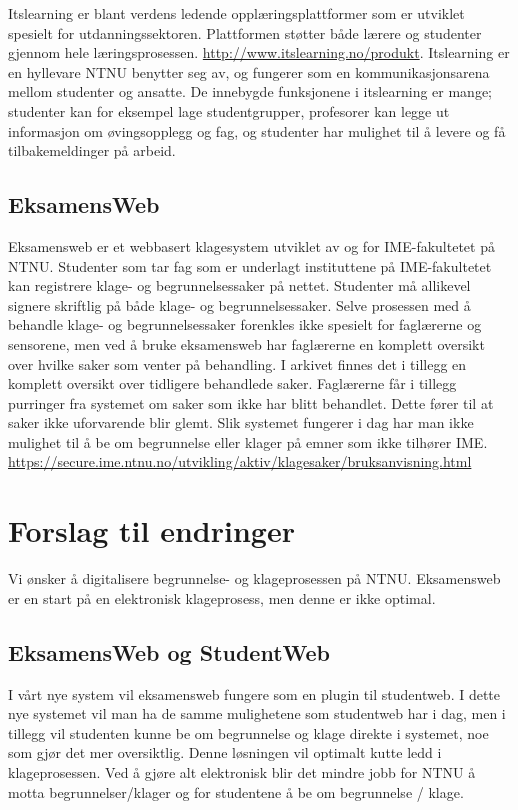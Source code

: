 \documentclass[12pt]{article}
\begin{document}
Itslearning er blant verdens ledende opplæringsplattformer som er utviklet spesielt for utdanningssektoren. Plattformen støtter både lærere og studenter gjennom hele læringsprosessen. \url{http://www.itslearning.no/produkt}. Itslearning er en hyllevare NTNU benytter seg av, og fungerer som en kommunikasjonsarena mellom studenter og ansatte. De innebygde funksjonene i itslearning er mange; studenter kan for eksempel  lage studentgrupper, profesorer kan legge ut informasjon om øvingsopplegg og fag, og studenter har mulighet til å levere og få tilbakemeldinger på arbeid.

\subsection{EksamensWeb}
Eksamensweb er et webbasert klagesystem utviklet av og for IME-fakultetet på NTNU. Studenter som tar fag som er underlagt instituttene på IME-fakultetet kan registrere klage- og begrunnelsessaker på nettet. Studenter må allikevel signere skriftlig på både klage- og begrunnelsessaker. Selve prosessen med å behandle klage- og begrunnelsessaker forenkles ikke spesielt for faglærerne og sensorene, men ved å bruke eksamensweb har faglærerne en komplett oversikt over hvilke saker som venter på behandling. I arkivet finnes det i tillegg en komplett oversikt over tidligere behandlede saker. Faglærerne får i tillegg purringer fra systemet om saker som ikke har blitt behandlet. Dette fører til at saker ikke uforvarende blir glemt. Slik systemet fungerer i dag har man ikke mulighet til å be om begrunnelse eller klager på emner som ikke tilhører IME.
\url{https://secure.ime.ntnu.no/utvikling/aktiv/klagesaker/bruksanvisning.html}


\section{Forslag til endringer}
Vi ønsker å digitalisere begrunnelse- og klageprosessen på NTNU. Eksamensweb er en start på en elektronisk klageprosess, men denne er ikke optimal.

\subsection*{EksamensWeb og StudentWeb}
I vårt nye system vil eksamensweb fungere som en plugin til studentweb. I dette nye systemet vil man ha de samme mulighetene som studentweb har i dag, men i tillegg vil studenten kunne be om begrunnelse og klage direkte i systemet, noe som gjør det mer oversiktlig. Denne løsningen vil optimalt kutte ledd i klageprosessen. Ved å gjøre alt elektronisk blir det mindre jobb for NTNU å motta begrunnelser/klager og for studentene å be om begrunnelse / klage.
\end{document}
